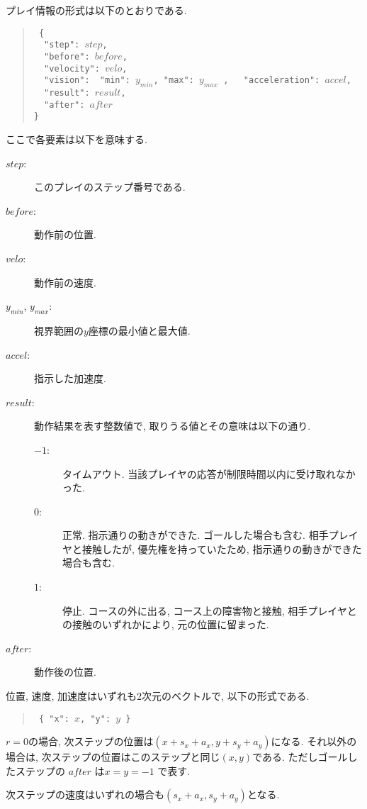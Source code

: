 \documentclass[11pt]{jarticle}
\begin{document}
プレイ情報の形式は以下のとおりである.
\begin{quote}\tt
\{\\
~~"step": $step$,\\
~~"before": $before$,\\
~~"velocity": $velo$,\\
~~"vision": { "min": $y_{min}$, "max": $y_{max}$ },
~~"acceleration": $accel$,\\
~~"result": $result$,\\
~~"after": $after$\\
\}
\end{quote}
ここで各要素は以下を意味する.
\begin{description}
\item[$step$:] このプレイのステップ番号である.
\item[$before$:] 動作前の位置.
\item[$velo$:] 動作前の速度.
\item[$y_{min}$, $y_{max}$:]
  視界範囲の$y$座標の最小値と最大値.
\item[$accel$:] 指示した加速度.
\item[$result$:] 動作結果を表す整数値で,
  取りうる値とその意味は以下の通り.
  \begin{description}
  \item[$-1$:] タイムアウト.  当該プレイヤの応答が制限時間以内に受け取れなかった.
  \item[$0$:] 正常.
    指示通りの動きができた.  ゴールした場合も含む.
    相手プレイヤと接触したが, 優先権を持っていたため, 指示通りの動きができた場合も含む.
  \item[$1$:] 停止.
    コースの外に出る, コース上の障害物と接触, 相手プレイヤとの接触のいずれかにより,
    元の位置に留まった.
  \end{description}
\item[$after$:] 動作後の位置.
\end{description}
位置, 速度, 加速度はいずれも2次元のベクトルで, 以下の形式である.
\begin{quote}\tt
\{ "x": $x$, "y": $y$ \}
\end{quote}
$r=0$の場合, 次ステップの位置は$(x+s_x+a_x, y+s_y+a_y)$になる.
それ以外の場合は, 次ステップの位置はこのステップと同じ$(x, y)$である.
ただしゴールしたステップの $after$ は$x=y=-1$ で表す.

次ステップの速度はいずれの場合も$(s_x+a_x, s_y+a_y)$となる.
\end{document}
